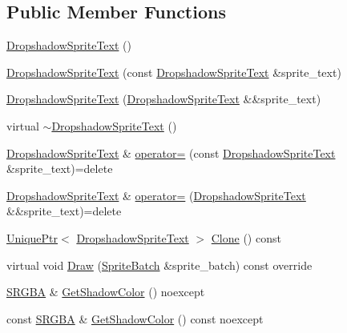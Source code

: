 \subsection*{Public Member Functions}
\begin{DoxyCompactItemize}
\item 
\hyperlink{classmage_1_1_dropshadow_sprite_text_a74003c0961117f9c04e2f4b70e71a74c}{Dropshadow\+Sprite\+Text} ()
\item 
\hyperlink{classmage_1_1_dropshadow_sprite_text_af0a9422a32ed8962d6c691fe76f44c30}{Dropshadow\+Sprite\+Text} (const \hyperlink{classmage_1_1_dropshadow_sprite_text}{Dropshadow\+Sprite\+Text} \&sprite\+\_\+text)
\item 
\hyperlink{classmage_1_1_dropshadow_sprite_text_a238b873f7b4d818cc3640e8f363f760e}{Dropshadow\+Sprite\+Text} (\hyperlink{classmage_1_1_dropshadow_sprite_text}{Dropshadow\+Sprite\+Text} \&\&sprite\+\_\+text)
\item 
virtual \hyperlink{classmage_1_1_dropshadow_sprite_text_a561b1be59d05bccb680969be792c0e28}{$\sim$\+Dropshadow\+Sprite\+Text} ()
\item 
\hyperlink{classmage_1_1_dropshadow_sprite_text}{Dropshadow\+Sprite\+Text} \& \hyperlink{classmage_1_1_dropshadow_sprite_text_a83846227264396ee5b6ca44304bc404a}{operator=} (const \hyperlink{classmage_1_1_dropshadow_sprite_text}{Dropshadow\+Sprite\+Text} \&sprite\+\_\+text)=delete
\item 
\hyperlink{classmage_1_1_dropshadow_sprite_text}{Dropshadow\+Sprite\+Text} \& \hyperlink{classmage_1_1_dropshadow_sprite_text_aea70f005fd9eae94aee9da27aa54534b}{operator=} (\hyperlink{classmage_1_1_dropshadow_sprite_text}{Dropshadow\+Sprite\+Text} \&\&sprite\+\_\+text)=delete
\item 
\hyperlink{namespacemage_a3316d7143a973e37adf1110f2e80ca31}{Unique\+Ptr}$<$ \hyperlink{classmage_1_1_dropshadow_sprite_text}{Dropshadow\+Sprite\+Text} $>$ \hyperlink{classmage_1_1_dropshadow_sprite_text_a0dcce82b4a83fbd469d68adba21af220}{Clone} () const
\item 
virtual void \hyperlink{classmage_1_1_dropshadow_sprite_text_af76422c9812d7dc38e9b98e587103c67}{Draw} (\hyperlink{classmage_1_1_sprite_batch}{Sprite\+Batch} \&sprite\+\_\+batch) const override
\item 
\hyperlink{structmage_1_1_s_r_g_b_a}{S\+R\+G\+BA} \& \hyperlink{classmage_1_1_dropshadow_sprite_text_ae397446f32257519efb24766edc0d0e8}{Get\+Shadow\+Color} () noexcept
\item 
const \hyperlink{structmage_1_1_s_r_g_b_a}{S\+R\+G\+BA} \& \hyperlink{classmage_1_1_dropshadow_sprite_text_ac441bdd3e94d80a27d33af2a01207704}{Get\+Shadow\+Color} () const noexcept
\end{DoxyCompactItemize}
